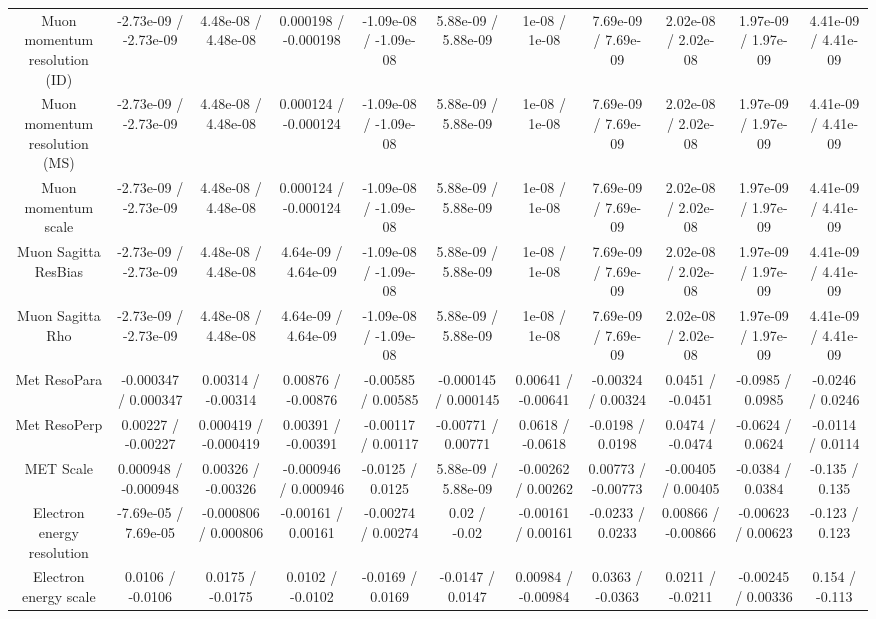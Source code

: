 \begin{table}[htbp]
\begin{center}
\begin{tabular}{|c|c|c|c|c|c|c|c|c|c|c|}
  Muon momentum resolution (ID) & -2.73e-09 / -2.73e-09 & 4.48e-08 / 4.48e-08 & 0.000198 / -0.000198 & -1.09e-08 / -1.09e-08 & 5.88e-09 / 5.88e-09 & 1e-08 / 1e-08 & 7.69e-09 / 7.69e-09 & 2.02e-08 / 2.02e-08 & 1.97e-09 / 1.97e-09 & 4.41e-09 / 4.41e-09 \\ 
  Muon momentum resolution (MS) & -2.73e-09 / -2.73e-09 & 4.48e-08 / 4.48e-08 & 0.000124 / -0.000124 & -1.09e-08 / -1.09e-08 & 5.88e-09 / 5.88e-09 & 1e-08 / 1e-08 & 7.69e-09 / 7.69e-09 & 2.02e-08 / 2.02e-08 & 1.97e-09 / 1.97e-09 & 4.41e-09 / 4.41e-09 \\ 
  Muon momentum scale & -2.73e-09 / -2.73e-09 & 4.48e-08 / 4.48e-08 & 0.000124 / -0.000124 & -1.09e-08 / -1.09e-08 & 5.88e-09 / 5.88e-09 & 1e-08 / 1e-08 & 7.69e-09 / 7.69e-09 & 2.02e-08 / 2.02e-08 & 1.97e-09 / 1.97e-09 & 4.41e-09 / 4.41e-09 \\ 
  Muon Sagitta ResBias & -2.73e-09 / -2.73e-09 & 4.48e-08 / 4.48e-08 & 4.64e-09 / 4.64e-09 & -1.09e-08 / -1.09e-08 & 5.88e-09 / 5.88e-09 & 1e-08 / 1e-08 & 7.69e-09 / 7.69e-09 & 2.02e-08 / 2.02e-08 & 1.97e-09 / 1.97e-09 & 4.41e-09 / 4.41e-09 \\ 
  Muon Sagitta Rho & -2.73e-09 / -2.73e-09 & 4.48e-08 / 4.48e-08 & 4.64e-09 / 4.64e-09 & -1.09e-08 / -1.09e-08 & 5.88e-09 / 5.88e-09 & 1e-08 / 1e-08 & 7.69e-09 / 7.69e-09 & 2.02e-08 / 2.02e-08 & 1.97e-09 / 1.97e-09 & 4.41e-09 / 4.41e-09 \\ 
  Met ResoPara & -0.000347 / 0.000347 & 0.00314 / -0.00314 & 0.00876 / -0.00876 & -0.00585 / 0.00585 & -0.000145 / 0.000145 & 0.00641 / -0.00641 & -0.00324 / 0.00324 & 0.0451 / -0.0451 & -0.0985 / 0.0985 & -0.0246 / 0.0246 \\ 
  Met ResoPerp & 0.00227 / -0.00227 & 0.000419 / -0.000419 & 0.00391 / -0.00391 & -0.00117 / 0.00117 & -0.00771 / 0.00771 & 0.0618 / -0.0618 & -0.0198 / 0.0198 & 0.0474 / -0.0474 & -0.0624 / 0.0624 & -0.0114 / 0.0114 \\ 
  MET Scale & 0.000948 / -0.000948 & 0.00326 / -0.00326 & -0.000946 / 0.000946 & -0.0125 / 0.0125 & 5.88e-09 / 5.88e-09 & -0.00262 / 0.00262 & 0.00773 / -0.00773 & -0.00405 / 0.00405 & -0.0384 / 0.0384 & -0.135 / 0.135 \\ 
  Electron energy resolution & -7.69e-05 / 7.69e-05 & -0.000806 / 0.000806 & -0.00161 / 0.00161 & -0.00274 / 0.00274 & 0.02 / -0.02 & -0.00161 / 0.00161 & -0.0233 / 0.0233 & 0.00866 / -0.00866 & -0.00623 / 0.00623 & -0.123 / 0.123 \\ 
  Electron energy scale & 0.0106 / -0.0106 & 0.0175 / -0.0175 & 0.0102 / -0.0102 & -0.0169 / 0.0169 & -0.0147 / 0.0147 & 0.00984 / -0.00984 & 0.0363 / -0.0363 & 0.0211 / -0.0211 & -0.00245 / 0.00336 & 0.154 / -0.113 \\ 

\end{tabular}
\end{center}
\end{table}
